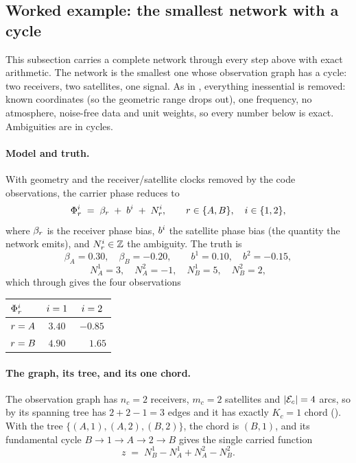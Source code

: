 \documentclass[main.tex]{subfiles}
\begin{document}
\subsection{Worked example: the smallest network with a cycle}
\label{sec:net-carry-example}

This subsection carries a complete network through every step above
with exact arithmetic.  The network is the smallest one whose
observation graph has a cycle: two receivers, two satellites, one
signal.  As in , everything inessential is removed: known coordinates (so the
geometric range drops out), one frequency, no atmosphere, noise-free
data and unit weights, so every number below is exact.  Ambiguities are
in cycles.

\paragraph{Model and truth.}
With geometry and the receiver/satellite clocks removed by the code
observations, the carrier phase reduces to
\begin{equation}
\Phi^{i}_{r} \;=\; \beta_r \;+\; b^{i} \;+\; N^{i}_{r},
\qquad r \in \{A,B\},\quad i \in \{1,2\},
\label{eq:carry-ex-model}
\end{equation}
where $\beta_r$ is the receiver phase bias, $b^{i}$ the satellite
phase bias (the quantity the network emits), and $N^{i}_{r}\in\mathbb{Z}$
the ambiguity.  The truth is
\[
\beta_A = 0.30,\quad \beta_B = -0.20,\qquad
b^1 = 0.10,\quad b^2 = -0.15,
\]
\[
N^1_A = 3,\quad N^2_A = -1,\quad N^1_B = 5,\quad N^2_B = 2,
\]
which through  gives the four observations
\begin{center}
\begin{tabular}{@{}lcc@{}}
\toprule
$\Phi^{i}_{r}$ & $i = 1$ & $i = 2$ \\
\midrule
$r = A$ & $3.40$ & $-0.85$ \\
$r = B$ & $4.90$ & $\phantom{-}1.65$ \\
\bottomrule
\end{tabular}
\end{center}

\paragraph{The graph, its tree, and its one chord.}
The observation graph has $n_c = 2$ receivers, $m_c = 2$ satellites and
$|\mathcal{E}_c| = 4$ arcs, so by  its spanning
tree has $2 + 2 - 1 = 3$ edges and it has exactly $K_c = 1$ chord
().  With the tree
$\{(A,1),(A,2),(B,2)\}$, the chord is $(B,1)$, and its fundamental
cycle $B \to 1 \to A \to 2 \to B$ gives the single carried function
\begin{equation}
z \;=\; N^1_B - N^1_A + N^2_A - N^2_B .
\label{eq:carry-ex-z}
\end{equation}
\end{document}
